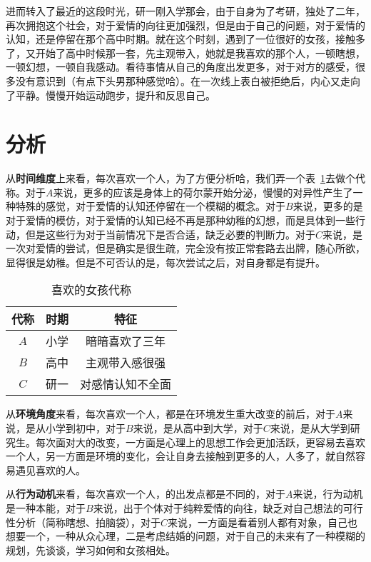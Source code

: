 \documentclass{article}
\begin{document}
进而转入了最近的这段时光，研一刚入学那会，由于自身为了考研，独处了二年，再次拥抱这个社会，对于爱情的向往更加强烈，但是由于自己的问题，对于爱情的认知，还是停留在那个高中时期。就在这个时刻，遇到了一位很好的女孩，接触多了，又开始了高中时候那一套，先主观带入，她就是我喜欢的那个人，一顿瞎想，一顿幻想，一顿自我感动。看待事情从自己的角度出发更多，对于对方的感受，很多没有意识到（有点下头男那种感觉哈）。在一次线上表白被拒绝后，内心又走向了平静。慢慢开始运动跑步，提升和反思自己。

\section{分析}

从\textbf{时间维度}上来看，每次喜欢一个人，为了方便分析哈，我们弄一个表~\ref{tab:girl}去做个代称。对于$A$来说，更多的应该是身体上的荷尔蒙开始分泌，慢慢的对异性产生了一种特殊的感觉，对于爱情的认知还停留在一个模糊的概念。对于$B$来说，更多的是对于爱情的模仿，对于爱情的认知已经不再是那种幼稚的幻想，而是具体到一些行动，但是这些行为对于当前情况下是否合适，缺乏必要的判断力。对于$C$来说，是一次对爱情的尝试，但是确实是很生疏，完全没有按正常套路去出牌，随心所欲，显得很是幼稚。但是不可否认的是，每次尝试之后，对自身都是有提升。

\begin{table}[!htb]
    \centering
    \caption{喜欢的女孩代称}
    \label{tab:girl}
    \begin{tabular}{ccc}
        \toprule
        代称 & 时期 & 特征\\
        \midrule
        $A$    & 小学 & 暗暗喜欢了三年\\
        $B$    & 高中 & 主观带入感很强\\
        $C$   & 研一 & 对感情认知不全面 \\
        \bottomrule
    \end{tabular}
\end{table}

从\textbf{环境角度}来看，每次喜欢一个人，都是在环境发生重大改变的前后，对于$A$来说，是从小学到初中，对于$B$来说，是从高中到大学，对于$C$来说，是从大学到研究生。每次面对大的改变，一方面是心理上的思想工作会更加活跃，更容易去喜欢一个人，另一方面是环境的变化，会让自身去接触到更多的人，人多了，就自然容易遇见喜欢的人。

从\textbf{行为动机}来看，每次喜欢一个人，的出发点都是不同的，对于$A$来说，行为动机是一种本能，对于$B$来说，出于个体对于纯粹爱情的向往，缺乏对自己想法的可行性分析（简称瞎想、拍脑袋），对于$C$来说，一方面是看着别人都有对象，自己也想要一个，一种从众心理，二是考虑结婚的问题，对于自己的未来有了一种模糊的规划，先谈谈，学习如何和女孩相处。
\end{document}
